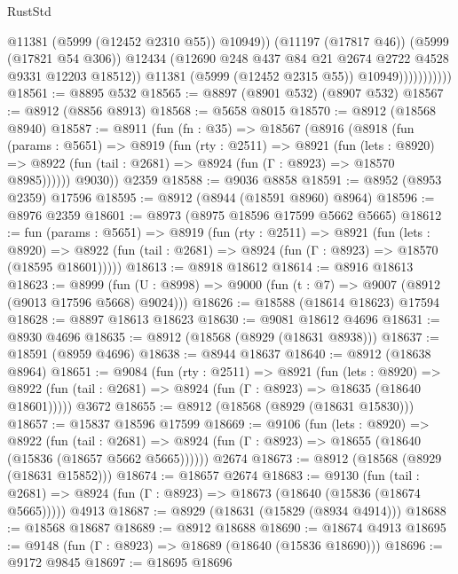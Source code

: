 \begin{lexlean}{RustStd}
\begin{coremodule}
                                @11381
                                (@5999 (@12452 @2310 @55))
                                @10949))
                            (@11197 (@17817 @46))
                            (@5999 (@17821 @54 @306))
                            @12434
                            (@12690 @248 @437 @84 @21 @2674 @2722 @4528 @9331 @12203 @18512))
                          @11381
                          (@5999 (@12452 @2315 @55))
                          @10949)))))))))))
@18561 := @8895 @532
@18565 := @8897 (@8901 @532) (@8907 @532)
@18567 := @8912 (@8856 @8913)
@18568 := @5658 @8015
@18570 := @8912 (@18568 @8940)
@18587 := @8911
    (fun (fn : @35) =>
    @18567
      (@8916
        (@8918
          (fun (params : @5651) =>
          @8919
            (fun (rty : @2511) =>
            @8921
              (fun (lets : @8920) =>
              @8922 (fun (tail : @2681) => @8924 (fun (Γ : @8923) => @18570 @8985))))))
        @9030))
    @2359
@18588 := @9036 @8858
@18591 := @8952 (@8953 @2359) @17596
@18595 := @8912 (@8944 (@18591 @8960) @8964)
@18596 := @8976 @2359
@18601 := @8973 (@8975 @18596 @17599 @5662 @5665)
@18612 := fun (params : @5651) =>
  @8919
    (fun (rty : @2511) =>
    @8921
      (fun (lets : @8920) =>
      @8922 (fun (tail : @2681) => @8924 (fun (Γ : @8923) => @18570 (@18595 @18601)))))
@18613 := @8918 @18612
@18614 := @8916 @18613
@18623 := @8999
    (fun (U : @8998) => @9000 (fun (t : @7) => @9007 (@8912 (@9013 @17596 @5668) @9024)))
@18626 := @18588 (@18614 @18623) @17594
@18628 := @8897 @18613 @18623
@18630 := @9081 @18612 @4696
@18631 := @8930 @4696
@18635 := @8912 (@18568 (@8929 (@18631 @8938)))
@18637 := @18591 (@8959 @4696)
@18638 := @8944 @18637
@18640 := @8912 (@18638 @8964)
@18651 := @9084
    (fun (rty : @2511) =>
    @8921
      (fun (lets : @8920) =>
      @8922 (fun (tail : @2681) => @8924 (fun (Γ : @8923) => @18635 (@18640 @18601)))))
    @3672
@18655 := @8912 (@18568 (@8929 (@18631 @15830)))
@18657 := @15837 @18596 @17599
@18669 := @9106
    (fun (lets : @8920) =>
    @8922
      (fun (tail : @2681) =>
      @8924 (fun (Γ : @8923) => @18655 (@18640 (@15836 (@18657 @5662 @5665))))))
    @2674
@18673 := @8912 (@18568 (@8929 (@18631 @15852)))
@18674 := @18657 @2674
@18683 := @9130
    (fun (tail : @2681) => @8924 (fun (Γ : @8923) => @18673 (@18640 (@15836 (@18674 @5665)))))
    @4913
@18687 := @8929 (@18631 (@15829 (@8934 @4914)))
@18688 := @18568 @18687
@18689 := @8912 @18688
@18690 := @18674 @4913
@18695 := @9148 (fun (Γ : @8923) => @18689 (@18640 (@15836 @18690)))
@18696 := @9172 @9845
@18697 := @18695 @18696

\end{coremodule}
\end{lexlean}
